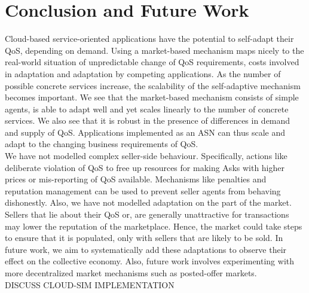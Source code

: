 \documentclass[10pt,journal,compsoc]{IEEEtran}
\begin{document}
\section{Conclusion and Future Work}
Cloud-based service-oriented applications have the potential to self-adapt their QoS, depending on demand. Using a market-based mechanism maps nicely to the real-world situation of unpredictable change of QoS requirements, costs involved in adaptation and adaptation by competing applications. As the number of possible concrete services increase, the scalability of the self-adaptive mechanism becomes important. We see that the market-based mechanism consists of simple agents, is able to adapt well and yet scales linearly to the number of concrete services. We also see that it is robust in the presence of differences in demand and supply of QoS. Applications implemented as an ASN can thus scale and adapt to the changing business requirements of QoS.\\
We have not modelled complex seller-side behaviour. Specifically, actions like deliberate violation of QoS to free up resources for making Asks with higher prices or mis-reporting of QoS available. Mechanisms like penalties and reputation management can be used to prevent seller agents from behaving dishonestly. Also, we have not modelled adaptation on the part of the market. Sellers that lie about their QoS or, are generally unattractive for transactions may lower the reputation of the marketplace. Hence, the market could take steps to ensure that it is populated, only with sellers that are likely to be sold. In future work, we aim to systematically add these adaptations to observe their effect on the collective economy. Also, future work involves experimenting with more decentralized market mechanisms such as posted-offer markets.\\
  
  DISCUSS CLOUD-SIM IMPLEMENTATION\\
  

\end{document}
